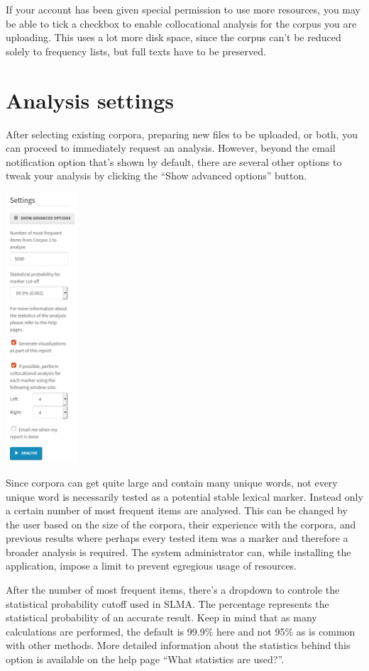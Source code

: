 \documentclass[11pt,a4paper]{article}
\begin{document}
If your account has been given special permission to use more resources, you may be able to tick a checkbox to enable collocational analysis for the corpus you are uploading. This uses a lot more disk space, since the corpus can't be reduced solely to frequency lists, but full texts have to be preserved.

\section{Analysis settings}

After selecting existing corpora, preparing new files to be uploaded, or both, you can proceed to immediately request an analysis. However, beyond the email notification option that's shown by default, there are several other options to tweak your analysis by clicking the ``Show advanced options'' button.

\centerline{\includegraphics[width=0.2\textwidth]{images/advancedsettings.png}}

Since corpora can get quite large and contain many unique words, not every unique word is necessarily tested as a potential stable lexical marker. Instead only a certain number of most frequent items are analysed. This can be changed by the user based on the size of the corpora, their experience with the corpora, and previous results where perhaps every tested item was a marker and therefore a broader analysis is required. The system administrator can, while installing the application, impose a limit to prevent egregious usage of resources. 

After the number of most frequent items, there's a dropdown to controle the statistical probability cutoff used in SLMA. The percentage represents the statistical probability of an accurate result. Keep in mind that as many calculations are performed, the default is 99.9\% here and not 95\% as is common with other methods. More detailed information about the statistics behind this option is available on the help page ``What statistics are used?''.
\end{document}
